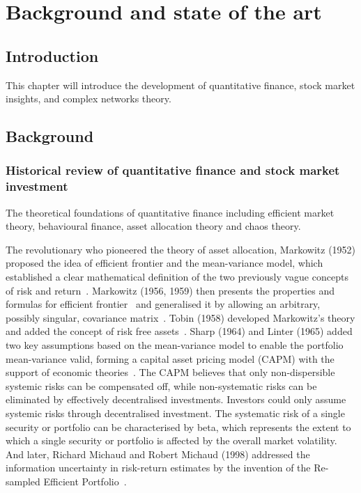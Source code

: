 \chapter[Background]{Background and state of the art}
\label{cpt:back}

\section{Introduction}
This chapter will introduce the development of quantitative finance, stock market insights, and complex networks theory.

\section{Background}
\subsection{Historical review of quantitative finance and stock market investment}
The theoretical foundations of quantitative finance including efficient market theory, behavioural finance, asset allocation theory and chaos theory.




The revolutionary who pioneered the theory of asset allocation, Markowitz (1952) proposed the idea of efficient frontier and the mean-variance model, which established a clear mathematical definition of the two previously vague concepts of risk and return~\cite{portfolio}. Markowitz (1956, 1959) then presents the properties and formulas for efficient frontier~\cite{markowitz1956optimization} and generalised it by allowing an arbitrary, possibly singular, covariance matrix~\cite{markowitz1959portfolio}. Tobin (1958) developed Markowitz's theory and added the concept of risk free assets~\cite{tobin1958liquidity}. Sharp (1964) and Linter (1965) added two key assumptions based on the mean-variance model to enable the portfolio mean-variance valid, forming a capital asset pricing model (CAPM) with the support of economic theories~\cite{equilibrium, diversification}. The CAPM believes that only non-dispersible systemic risks can be compensated off, while non-systematic risks can be eliminated by effectively decentralised investments. Investors could only assume systemic risks through decentralised investment. The systematic risk of a single security or portfolio can be characterised by beta, which represents the extent to which a single security or portfolio is affected by the overall market volatility. And later, Richard Michaud and Robert Michaud (1998) addressed the information uncertainty in risk-return estimates by the invention of the Re-sampled Efficient Portfolio~\cite{michaud1998asset}.

